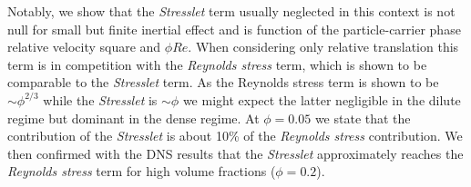 \begin{enumerate}
    Notably, we show that the \textit{Stresslet} term usually neglected in this context is not null for small but finite inertial effect and is function of the particle-carrier phase relative velocity square and $\phi Re$.  
    When considering only relative translation this term is in competition with the \textit{Reynolds stress} term, which is shown to be comparable to the \textit{Stresslet} term. 
    As the Reynolds stress term is shown to be $\sim \phi^{2/3}$ while the \textit{Stresslet} is $\sim \phi$ we might expect the latter negligible in the dilute regime but dominant in the dense regime. 
    At $\phi = 0.05$ we state that the contribution of the \textit{Stresslet} is about 10\% of the \textit{Reynolds stress} contribution. 
    We then confirmed with the DNS results that the \textit{Stresslet} approximately reaches the \textit{Reynolds stress} term for high volume fractions ($\phi=0.2$). 
\end{enumerate}
